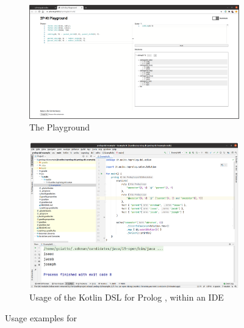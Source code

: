 \documentclass[12pt,a4paper,openright,twoside]{book}
\begin{document}
\begin{figure}
    \begin{subfigure}{.49\linewidth}
        \includegraphics[width=\linewidth]{figures/2p-playground.png}
        \caption{The \twopkt{} Playground \cite{2P-Playground}}
        \label{fig:playground}
    \end{subfigure}
    \hfill
    \begin{subfigure}{.49\linewidth}
        \includegraphics[width=\linewidth]{figures/2p-kt-dsl.png}
        \caption{Usage of the Kotlin DSL for Prolog \cite{kotlindsi4prolog-woa2020}, within an IDE}
        \label{fig:dsl}
    \end{subfigure}
    \caption{Usage examples for \twopkt{}}
    \label{fig:usage-examples}
\end{figure}

%
\end{document}
